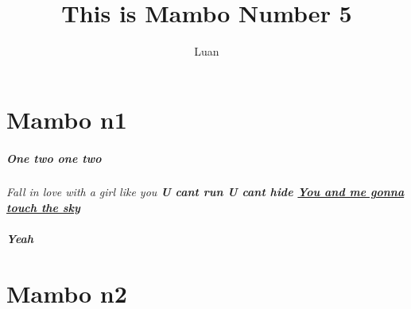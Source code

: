 \documentclass[11pt, a4paper]{article}
\title{This is Mambo Number 5}
\author{Luan}
\begin{document}
\maketitle

\chapter{Mambo n1}
\paragraph{One two one two}
\it{Fall in love with a girl like you}
\bf{U cant run U cant hide}
\underline{You and me gonna touch the sky}
\paragraph{Yeah}

\chapter{Mambo n2}
\end{document}
